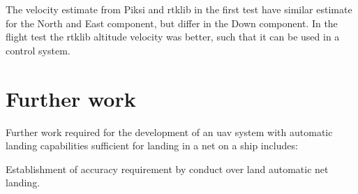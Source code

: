 
The velocity estimate from Piksi and \gls{rtklib} in the first test have similar estimate for the North and East component, but differ in the Down component. In the flight test the \gls{rtklib} altitude velocity was better, such that it can be used in a control system.
%
%
%
%
%
%
%
%
%
%
%
%
%
%
%
%
%


\section{Further work}
Further work required for the development of an \gls{uav} system with automatic landing capabilities sufficient for landing in a net on a ship includes:

Establishment of accuracy requirement by conduct over land automatic net landing.

